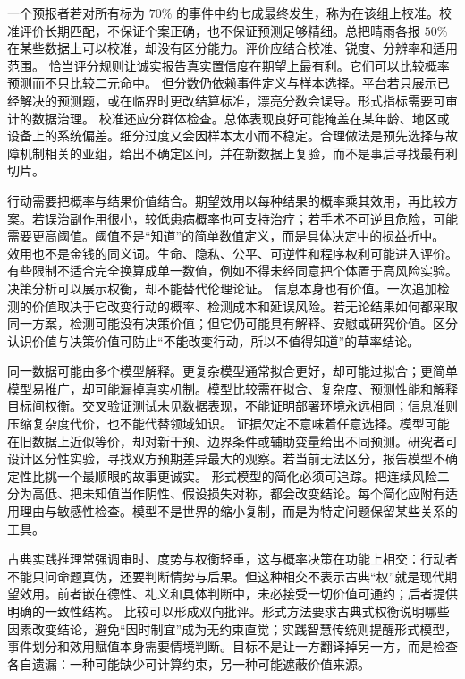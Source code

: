 一个预报者若对所有标为 \(70\%\) 的事件中约七成最终发生，称为在该组上校准。校准评价长期匹配，不保证个案正确，也不保证预测足够精细。总把晴雨各报 \(50\%\) 在某些数据上可以校准，却没有区分能力。评价应结合校准、锐度、分辨率和适用范围。 恰当评分规则让诚实报告真实置信度在期望上最有利。它们可以比较概率预测而不只比较二元命中。\parencite{joyce1998} 但分数仍依赖事件定义与样本选择。平台若只展示已经解决的预测题，或在临界时更改结算标准，漂亮分数会误导。形式指标需要可审计的数据治理。 校准还应分群体检查。总体表现良好可能掩盖在某年龄、地区或设备上的系统偏差。细分过度又会因样本太小而不稳定。合理做法是预先选择与故障机制相关的亚组，给出不确定区间，并在新数据上复验，而不是事后寻找最有利切片。

行动需要把概率与结果价值结合。期望效用以每种结果的概率乘其效用，再比较方案。若误治副作用很小，较低患病概率也可支持治疗；若手术不可逆且危险，可能需要更高阈值。阈值不是“知道”的简单数值定义，而是具体决定中的损益折中。\parencite{jeffrey1983} 效用也不是金钱的同义词。生命、隐私、公平、可逆性和程序权利可能进入评价。有些限制不适合完全换算成单一数值，例如不得未经同意把个体置于高风险实验。决策分析可以展示权衡，却不能替代伦理论证。 信息本身也有价值。一次追加检测的价值取决于它改变行动的概率、检测成本和延误风险。若无论结果如何都采取同一方案，检测可能没有决策价值；但它仍可能具有解释、安慰或研究价值。区分认识价值与决策价值可防止“不能改变行动，所以不值得知道”的草率结论。

同一数据可能由多个模型解释。更复杂模型通常拟合更好，却可能过拟合；更简单模型易推广，却可能漏掉真实机制。模型比较需在拟合、复杂度、预测性能和解释目标间权衡。交叉验证测试未见数据表现，不能证明部署环境永远相同；信息准则压缩复杂度代价，也不能代替领域知识。 证据欠定不意味着任意选择。模型可能在旧数据上近似等价，却对新干预、边界条件或辅助变量给出不同预测。研究者可设计区分性实验，寻找双方预期差异最大的观察。若当前无法区分，报告模型不确定性比挑一个最顺眼的故事更诚实。 形式模型的简化必须可追踪。把连续风险二分为高低、把未知值当作阴性、假设损失对称，都会改变结论。每个简化应附有适用理由与敏感性检查。模型不是世界的缩小复制，而是为特定问题保留某些关系的工具。

古典实践推理常强调审时、度势与权衡轻重，这与概率决策在功能上相交：行动者不能只问命题真伪，还要判断情势与后果。但这种相交不表示古典“权”就是现代期望效用。前者嵌在德性、礼义和具体判断中，未必接受一切价值可通约；后者提供明确的一致性结构。 比较可以形成双向批评。形式方法要求古典式权衡说明哪些因素改变结论，避免“因时制宜”成为无约束直觉；实践智慧传统则提醒形式模型，事件划分和效用赋值本身需要情境判断。目标不是让一方翻译掉另一方，而是检查各自遗漏：一种可能缺少可计算约束，另一种可能遮蔽价值来源。

